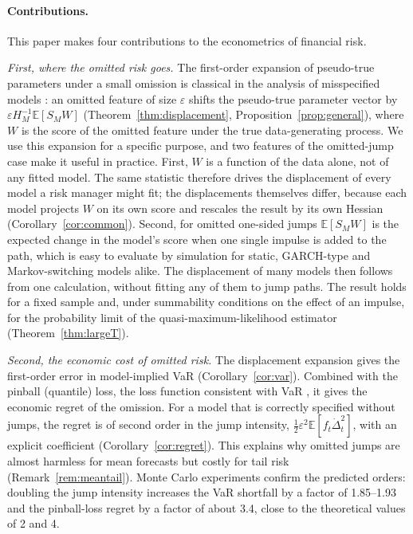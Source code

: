 \documentclass[11pt,a4paper]{article}
\theoremstyle{definition}
\theoremstyle{remark}
\newcommand{\E}{\mathbb{E}}
\begin{document}
\paragraph{Contributions.} This paper makes four contributions to the econometrics of financial risk.

\emph{First, where the omitted risk goes.} The first-order expansion of pseudo-true parameters under a small omission is classical in the analysis of misspecified models \citep{white1982,kitamura2013,bonhomme2022}: an omitted feature of size $\varepsilon$ shifts the pseudo-true parameter vector by $\varepsilon H_M^{-1}\E[S_MW]$ (Theorem~\ref{thm:displacement}, Proposition~\ref{prop:general}), where $W$ is the score of the omitted feature under the true data-generating process. We use this expansion for a specific purpose, and two features of the omitted-jump case make it useful in practice. First, $W$ is a function of the data alone, not of any fitted model. The same statistic therefore drives the displacement of every model a risk manager might fit; the displacements themselves differ, because each model projects $W$ on its own score and rescales the result by its own Hessian (Corollary~\ref{cor:common}). Second, for omitted one-sided jumps $\E[S_MW]$ is the expected change in the model's score when one single impulse is added to the path, which is easy to evaluate by simulation for static, GARCH-type and Markov-switching models alike. The displacement of many models then follows from one calculation, without fitting any of them to jump paths. The result holds for a fixed sample and, under summability conditions on the effect of an impulse, for the probability limit of the quasi-maximum-likelihood estimator (Theorem~\ref{thm:largeT}).

\emph{Second, the economic cost of omitted risk.} The displacement expansion gives the first-order error in model-implied VaR (Corollary~\ref{cor:var}). Combined with the pinball (quantile) loss, the loss function consistent with VaR \citep{koenker1978,gneiting2011}, it gives the economic regret of the omission. For a model that is correctly specified without jumps, the regret is of second order in the jump intensity, $\tfrac12\varepsilon^2\E[f_t\dot\Delta_t^2]$, with an explicit coefficient (Corollary~\ref{cor:regret}). This explains why omitted jumps are almost harmless for mean forecasts but costly for tail risk (Remark~\ref{rem:meantail}). Monte Carlo experiments confirm the predicted orders: doubling the jump intensity increases the VaR shortfall by a factor of 1.85--1.93 and the pinball-loss regret by a factor of about 3.4, close to the theoretical values of 2 and 4.
\end{document}
